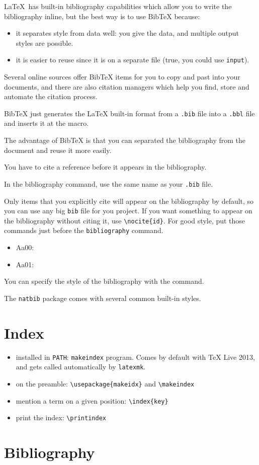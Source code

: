 \documentclass[12pt]{article}
\begin{document}
  \LaTeX\ has built-in bibliography capabilities which allow you to write the bibliography inline, but the best way is to use BibTeX because:

  \begin{itemize}
    \item it separates style from data well: you give the data, and multiple output styles are possible.
    \item it is easier to reuse since it is on a separate file (true, you could use \lstinline|input|).
  \end{itemize}

  Several online sources offer BibTeX items for you to copy and past into your documents, and there are also citation managers which help you find, store and automate the citation process.

  BibTeX just generates the LaTeX built-in format from a \lstinline|.bib| file into a \lstinline|.bbl| file and inserts it at the \lstinline|| macro.

  The advantage of BibTeX is that you can separated the bibliography from the document and reuse it more easily.

  You have to cite a reference before it appears in the bibliography.

  In the bibliography command, use the same name as your \lstinline|.bib| file.

  Only items that you explicitly cite will appear on the bibliography by default, so you can use any big \lstinline|bib| file for you project. If you want something to appear on the bibliography without citing it, use \lstinline|\nocite{id}|. For good style, put those commands just before the \lstinline|bibliography| command.

  \begin{itemize}
    \item Aa00: \cite{Aa00}
    \item Aa01: \cite{Aa01}
  \end{itemize}

  You can specify the style of the bibliography with the \lstinline||  command.

  The \lstinline|natbib| package comes with several common built-in styles.

\section{Index}\label{index}

  \begin{itemize}
    \item installed in \lstinline|PATH|: \lstinline|makeindex| program. Comes by default with TeX Live 2013, and gets called automatically by \lstinline|latexmk|.
    \item on the preamble: \lstinline|\usepackage{makeidx}| and \lstinline|\makeindex|
    \item mention a term on a given position: \lstinline|\index{key}|
    \item print the index: \lstinline|\printindex|
  \end{itemize}


  \printindex

\section{Bibliography}\label{secBib}

  
  
\end{document}
